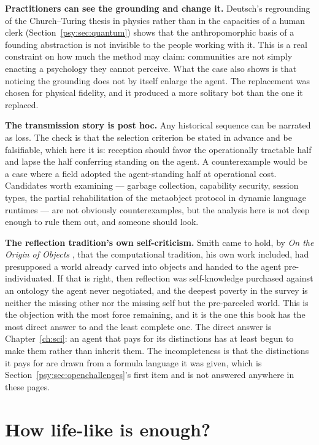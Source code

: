 \textbf{Practitioners can see the grounding and change it.}
Deutsch's regrounding of the Church--Turing thesis in physics rather
than in the capacities of a human clerk
(Section~\ref{psy:sec:quantum}) shows that the anthropomorphic basis
of a founding abstraction is not invisible to the people working
with it.
This is a real constraint on how much the method may claim:
communities are not simply enacting a psychology they cannot
perceive.
What the case also shows is that noticing the grounding does not by
itself enlarge the agent.
The replacement was chosen for physical fidelity, and it produced a
more solitary bot than the one it replaced.

\textbf{The transmission story is post hoc.}
Any historical sequence can be narrated as loss.
The check is that the selection criterion be stated in advance and
be falsifiable, which here it is: reception should favor the
operationally tractable half and lapse the half conferring standing
on the agent.
A counterexample would be a case where a field adopted the
agent-standing half at operational cost.
Candidates worth examining --- garbage collection, capability
security, session types, the partial rehabilitation of the
metaobject protocol in dynamic language runtimes --- are not
obviously counterexamples, but the analysis here is not deep enough
to rule them out, and someone should look.

\textbf{The reflection tradition's own self-criticism.}
Smith came to hold, by \emph{On the Origin of Objects}
\cite{smith1996}, that the computational tradition, his own work
included, had presupposed a world already carved into objects and
handed to the agent pre-individuated.
If that is right, then reflection was self-knowledge purchased
against an ontology the agent never negotiated, and the deepest
poverty in the survey is neither the missing other nor the missing
self but the pre-parceled world.
This is the objection with the most force remaining, and it is the
one this book has the most direct answer to and the least complete
one.
The direct answer is Chapter~\ref{ch:sci}: an agent that pays for
its distinctions has at least begun to make them rather than inherit
them.
The incompleteness is that the distinctions it pays for are drawn
from a formula language it was given, which is
Section~\ref{psy:sec:openchallenges}'s first item and is not
answered anywhere in these pages.

\section{How life-like is enough?}
\label{psy:sec:threshold}

